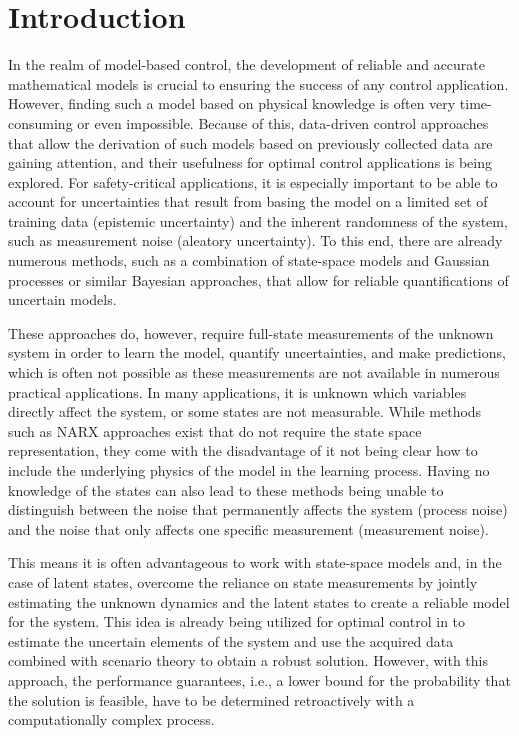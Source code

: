 \chapter{Introduction}
\label{sec:introduction}

In the realm of model-based control, the development of reliable and accurate mathematical models is crucial to ensuring the success of any control application. However, finding such a model based on physical knowledge is often very time-consuming or even impossible. Because of this, data-driven control approaches that allow the derivation of such models based on previously collected data are gaining attention, and their usefulness for optimal control applications is being explored. For safety-critical applications, it is especially important to be able to account for uncertainties that result from basing the model on a limited set of training data (epistemic uncertainty) and the inherent randomness of the system, such as measurement noise (aleatory uncertainty). To this end, there are already numerous methods, such as a combination of state-space models and Gaussian processes \cite{Williams_06} or similar Bayesian approaches, that allow for reliable quantifications of uncertain models.

These approaches do, however, require full-state measurements of the unknown system in order to learn the model, quantify uncertainties, and make predictions, which is often not possible as these measurements are not available in numerous practical applications. In many applications, it is unknown which variables directly affect the system, or some states are not measurable. While methods such as NARX approaches \cite{Maiworm_21} exist that do not require the state space representation, they come with the disadvantage of it not being clear how to include the underlying physics of the model in the learning process. Having no knowledge of the states can also lead to these methods being unable to distinguish between the noise that permanently affects the system (process noise) and the noise that only affects one specific measurement (measurement noise). 

This means it is often advantageous to work with state-space models and, in the case of latent states, overcome the reliance on state measurements by jointly estimating the unknown dynamics and the latent states to create a reliable model for the system. This idea is already being utilized for optimal control in \cite{Robert_24} to estimate the uncertain elements of the system and use the acquired data combined with scenario theory \cite{Garatti_22} to obtain a robust solution. However, with this approach, the performance guarantees, i.e., a lower bound for the probability that the solution is feasible, have to be determined retroactively with a computationally complex process.
 
